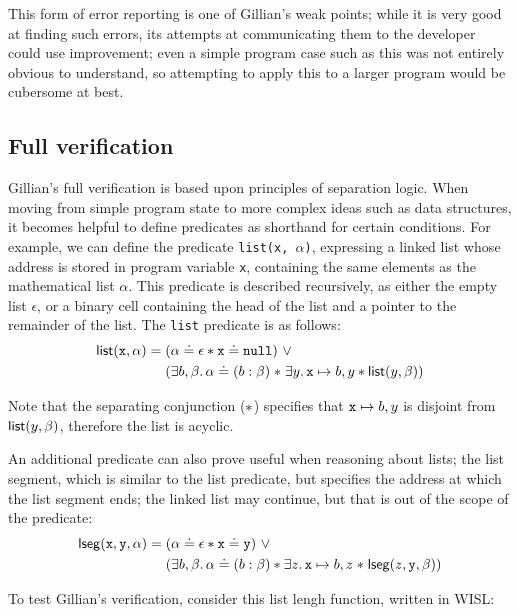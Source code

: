 This form of error reporting is one of Gillian's weak points; while it is very
good at finding such errors, its attempts at communicating them to the
developer could use improvement; even a simple program case such as this was
not entirely obvious to understand, so attempting to apply this to a larger
program would be cubersome at best.

\subsection{Full verification}

Gillian's full verification is based upon principles of separation logic. When
moving from simple program state to more complex ideas such as data structures,
it becomes helpful to define predicates as shorthand for certain conditions.
For example, we can define the predicate \texttt{list(x, $\alpha$)}, expressing
a linked list whose address is stored in program variable \texttt{x},
containing the same elements as the mathematical list $\alpha$. This predicate
is described recursively, as either the empty list $\epsilon$, or a binary cell
containing the head of the list and a pointer to the remainder of the list. The
\texttt{list} predicate is as follows:
\begin{align*}
  \mathsf{list}(\mathtt{x}, \alpha) =\; &(\alpha \doteq \epsilon \ast \mathtt{x} \doteq \mathtt{null})~\lor\\
  & (\exists b, \beta \ldotp \alpha \doteq (b : \beta) \mathrel{*} \exists y \ldotp \mathtt{x} \mapsto b, y \ast \mathsf{list}(y, \beta))
\end{align*}

Note that the separating conjunction ($\mathrel{*}$) specifies that
$\mathtt{x} \mapsto b, y$ is disjoint from $\mathsf{list}(y, \beta)$, therefore the
list is acyclic.

An additional predicate can also prove useful when reasoning about lists; the
list segment, which is similar to the list predicate, but specifies the address
at which the list segment ends; the linked list may continue, but that is out
of the scope of the predicate:
\begin{align*}
  \mathsf{lseg}(\mathtt{x}, \mathtt{y}, \alpha) =\; &(\alpha \doteq \epsilon \ast \mathtt{x} \doteq \mathtt{y})~\lor\\
  &(\exists b, \beta \ldotp \alpha \doteq (b : \beta) \ast \exists z \ldotp \mathtt{x} \mapsto b, z \mathrel{*} \mathsf{lseg}(z, \mathtt{y}, \beta))
\end{align*}

To test Gillian's verification, consider this list lengh function, written in WISL:\@

